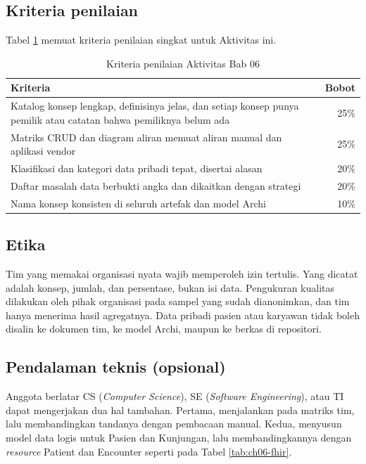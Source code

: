\subsection*{Kriteria penilaian}

Tabel \ref{tab:ch06-kriteria} memuat kriteria penilaian singkat untuk
Aktivitas ini.

\begin{table}[!htb]
  \centering
  \caption{Kriteria penilaian Aktivitas Bab 06}
  \label{tab:ch06-kriteria}
  \begin{tabularx}{\textwidth}{Xr}
    \hline
    \textbf{Kriteria} & \textbf{Bobot} \\
    \hline
    Katalog konsep lengkap, definisinya jelas, dan setiap konsep punya pemilik
      atau catatan bahwa pemiliknya belum ada & 25\% \\
    \hline
    Matriks CRUD dan diagram aliran memuat aliran manual dan aplikasi vendor &
      25\% \\
    \hline
    Klasifikasi dan kategori data pribadi tepat, disertai alasan & 20\% \\
    \hline
    Daftar masalah data berbukti angka dan dikaitkan dengan strategi & 20\% \\
    \hline
    Nama konsep konsisten di seluruh artefak dan model Archi & 10\% \\
    \hline
  \end{tabularx}
\end{table}

\subsection*{Etika}

Tim yang memakai organisasi nyata wajib memperoleh izin tertulis. Yang dicatat
adalah konsep, jumlah, dan persentase, bukan isi data. Pengukuran kualitas
dilakukan oleh pihak organisasi pada sampel yang sudah dianonimkan, dan tim
hanya menerima hasil agregatnya. Data pribadi pasien atau karyawan tidak boleh
disalin ke dokumen tim, ke model Archi, maupun ke berkas di repositori.

\subsection*{Pendalaman teknis (opsional)}

Anggota berlatar CS (\textit{Computer Science}), SE (\textit{Software
Engineering}), atau TI dapat mengerjakan dua hal
tambahan. Pertama, menjalankan
 pada matriks tim, lalu
membandingkan tandanya dengan pembacaan manual. Kedua, menyusun model data
logis untuk Pasien dan Kunjungan, lalu membandingkannya dengan
\textit{resource} Patient dan Encounter seperti pada Tabel \ref{tab:ch06-fhir}.


